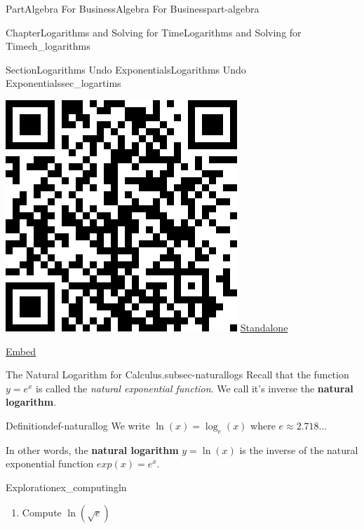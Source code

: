 \documentclass{tufte-book}
\newcommand{\terminology}[1]{\textbf{#1}}
\numberwithin{equation}{chapter}
\begin{document}
\begin{partptx}{Part}{Algebra For Business}{}{Algebra For Business}{}{}{part-algebra}
\begin{chapterptx}{Chapter}{Logarithms and Solving for Time}{}{Logarithms and Solving for Time}{}{}{ch_logarithms}
\begin{sectionptx}{Section}{Logarithms Undo Exponentials}{}{Logarithms Undo Exponentials}{}{}{sec_logartims}
\begin{sidebyside}{2}{0.075}{0.075}{0.17}
\begin{sbspanel}{0.21}
\includegraphics[width=\linewidth]{generated/qrcode/sec_logartims-9.png}
\href{http://webwork.bridgew.edu/oer/functions_at_work/sec_logartims-9.html}{Standalone}%
\par
\href{http://webwork.bridgew.edu/oer/functions_at_work/sec_logartims-9-if.html}{Embed}%
\end{sbspanel}%
\end{sidebyside}%
\begin{paragraphs}{The Natural Logarithm for Calculus.}{subsec-naturallogs}%
Recall that the function \(y = e^x\) is called the \emph{natural exponential function}.  We call it's inverse the \terminology{natural logarithm}.%
\begin{definition}{Definition}{}{def-naturallog}%
We write \(\ln(x) = \log_e(x)\) where \(e\approx 2.718\dots\)%
\par
In other words, the \terminology{natural logarithm} \(y = \ln(x)\) is the inverse of the natural exponential function \(exp(x) = e^x\).%
\end{definition}
\begin{exploration}{Exploration}{}{ex_computingln}%
\begin{enumerate}[font=\bfseries,label=(\alph*),ref=\alph*]%
\item{}Compute \(\ln(\sqrt{e})\)%
\par\smallskip%

\end{enumerate}
\end{exploration}
\end{paragraphs}
\end{sectionptx}
\end{chapterptx}
\end{partptx}
\end{document}
